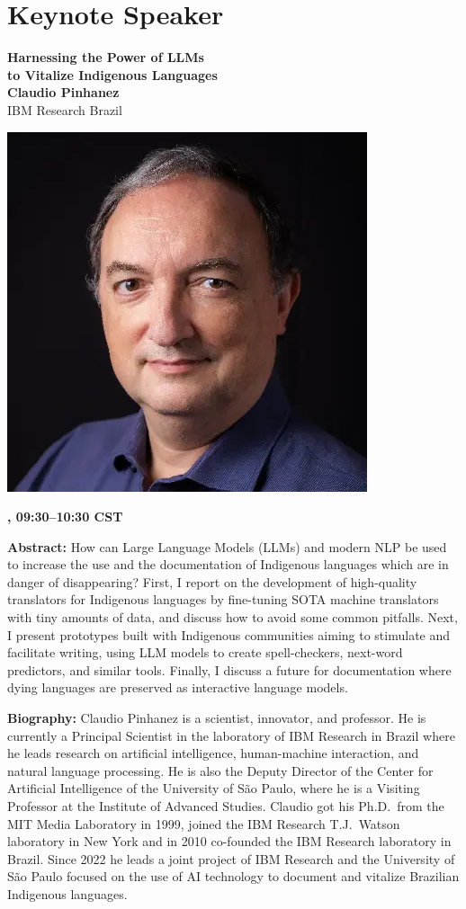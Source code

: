\newpage
{}
\section{Keynote Speaker}

\begin{center}
{\bfseries\Large Harnessing the Power of LLMs\\\vspace{2.0\lineskip}to Vitalize Indigenous Languages} \\
\vspace{1.0em}
{\large\bf Claudio Pinhanez} \\
IBM Research Brazil

\includegraphics[width=0.4\linewidth]{content/day1/claudio-headshot.png}

\textbf{\daydateyear{}, 09:30--10:30 CST}\\
\textbf{\PlenaryLoc{}}
\end{center}

\noindent
{\bfseries Abstract:} How can Large Language Models (LLMs) and modern NLP be used to increase the use and the documentation of Indigenous languages which are in danger of disappearing? First, I report on the development of high-quality translators for Indigenous languages by fine-tuning SOTA machine translators with tiny amounts of data, and discuss how to avoid some common pitfalls. Next, I present prototypes built with Indigenous communities aiming to stimulate and facilitate writing, using LLM models to create spell-checkers, next-word predictors, and similar tools. Finally, I discuss a future for documentation where dying languages are preserved as interactive language models.

\vspace{1em}

{\bfseries Biography:} 
Claudio Pinhanez is a scientist, innovator, and professor. He is currently a Principal Scientist in the laboratory of IBM Research in Brazil where he leads research on artificial intelligence, human-machine interaction, and natural language processing. He is also the Deputy Director of the Center for Artificial Intelligence of the University of S\~ao Paulo, where he is a Visiting Professor at the Institute of Advanced Studies. Claudio got his Ph.D.~from the MIT Media Laboratory in 1999, joined the IBM Research T.J.~Watson laboratory in New York and in 2010 co-founded the IBM Research laboratory in Brazil. Since 2022 he leads a joint project of IBM Research and the University of S\~ao Paulo focused on the use of AI technology to document and vitalize Brazilian Indigenous languages.

\newpage
